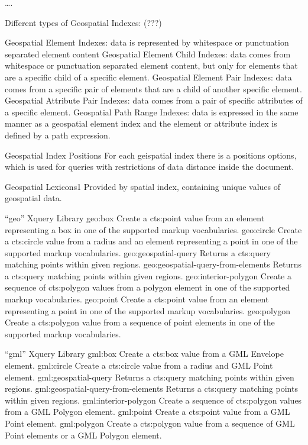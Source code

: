 \documentclass[a4paper,12pt]{article}
\begin{document}
…. 

Different types of Geospatial Indexes: (???)

 Geospatial Element Indexes: data is represented by whitespace or punctuation separated element content 
 Geospatial Element Child Indexes: data comes from whitespace or punctuation separated element content, but only for elements that are a specific child of a specific element.
 Geospatial Element Pair Indexes: data comes from a specific pair of elements that are a child of another specific element.
 Geospatial Attribute Pair Indexes: data comes from a pair of specific attributes of a specific element.
 Geospatial Path Range Indexes: data is expressed in the same manner as a geospatial element index and the element or attribute index is defined by a path expression.


Geospatial Index Positions
	For each geispatial index there is a positions options, which is used for queries with restrictions 	of data distance inside the document.

Geospatial Lexicons1
Provided by spatial index, containing unique values of  geospatial data. 

“geo” Xquery Library
geo:box
Create a cts:point value from an element representing a box in one of the supported markup vocabularies.
geo:circle
Create a cts:circle value from a radius and an element representing a point in one of the supported markup vocabularies.
geo:geospatial-query
Returns a cts:query matching points within given regions.
geo:geospatial-query-from-elements
Returns a cts:query matching points within given regions.
geo:interior-polygon
Create a sequence of cts:polygon values from a polygon element in one of the supported markup vocabularies.
geo:point
Create a cts:point value from an element representing a point in one of the supported markup vocabularies.
geo:polygon
Create a cts:polygon value from a sequence of point elements in one of the supported markup vocabularies.


“gml” Xquery Library
gml:box
Create a cts:box value from a GML Envelope element.
gml:circle
Create a cts:circle value from a radius and GML Point element.
gml:geospatial-query
Returns a cts:query matching points within given regions.
gml:geospatial-query-from-elements
Returns a cts:query matching points within given regions.
gml:interior-polygon
Create a sequence of cts:polygon values from a GML Polygon element.
gml:point
Create a cts:point value from a GML Point element.
gml:polygon
Create a cts:polygon value from a sequence of GML Point elements or a GML Polygon element.
\end{document}
